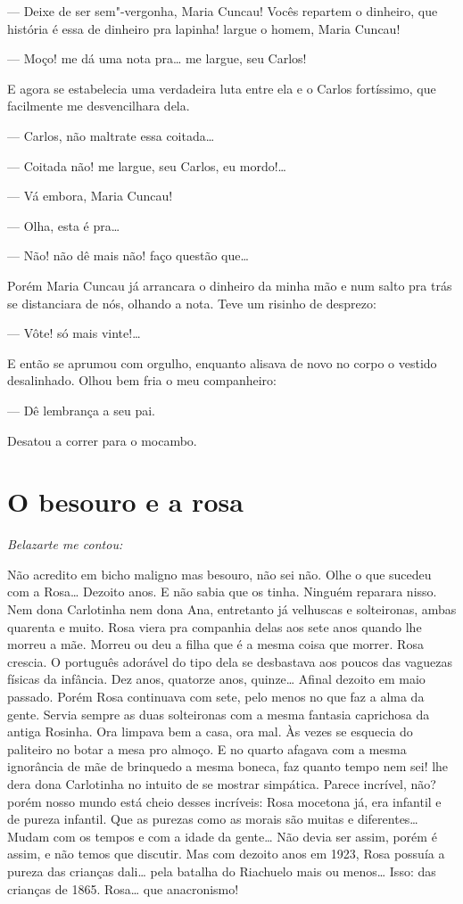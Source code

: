--- Deixe de ser sem"-vergonha, Maria Cuncau! Vocês repartem o dinheiro,
que história é essa de dinheiro pra lapinha! largue o homem, Maria
Cuncau!

--- Moço! me dá uma nota pra\ldots{} me largue, seu Carlos!

E agora se estabelecia uma verdadeira luta entre ela e o Carlos
fortíssimo, que facilmente me desvencilhara dela.

--- Carlos, não maltrate essa coitada\ldots{}

--- Coitada não! me largue, seu Carlos, eu mordo!\ldots{}

--- Vá embora, Maria Cuncau!

--- Olha, esta é pra\ldots{}

--- Não! não dê mais não! faço questão que\ldots{}

Porém Maria Cuncau já arrancara o dinheiro da minha mão e num salto pra
trás se distanciara de nós, olhando a nota. Teve um risinho de desprezo:

--- Vôte! só mais vinte!\ldots{}

E então se aprumou com orgulho, enquanto alisava de novo no corpo o
vestido desalinhado. Olhou bem fria o meu companheiro:

--- Dê lembrança a seu pai.

Desatou a correr para o mocambo.

\chapter{O besouro e a rosa}


\emph{Belazarte me contou:}

Não acredito em bicho maligno mas besouro, não sei não. Olhe o que
sucedeu com a Rosa\ldots{} Dezoito anos. E não sabia que os tinha. Ninguém
reparara nisso. Nem dona Carlotinha nem dona Ana, entretanto já
velhuscas e solteironas, ambas quarenta e muito. Rosa viera pra
companhia delas aos sete anos quando lhe morreu a mãe. Morreu ou deu a
filha que é a mesma coisa que morrer. Rosa crescia. O português adorável
do tipo dela se desbastava aos poucos das vaguezas físicas da infância.
Dez anos, quatorze anos, quinze\ldots{} Afinal dezoito em maio passado. Porém
Rosa continuava com sete, pelo menos no que faz a alma da gente. Servia
sempre as duas solteironas com a mesma fantasia caprichosa da antiga
Rosinha. Ora limpava bem a casa, ora mal. Às vezes se esquecia do
paliteiro no botar a mesa pro almoço. E no quarto afagava com a mesma
ignorância de mãe de brinquedo a mesma boneca, faz quanto tempo nem sei!
lhe dera dona Carlotinha no intuito de se mostrar simpática. Parece
incrível, não? porém nosso mundo está cheio desses incríveis: Rosa
mocetona já, era infantil e de pureza infantil. Que as purezas como as
morais são muitas e diferentes\ldots{} Mudam com os tempos e com a idade da
gente\ldots{} Não devia ser assim, porém é assim, e não temos que discutir.
Mas com dezoito anos em 1923, Rosa possuía a pureza das crianças dali\ldots{}
pela batalha do Riachuelo mais ou menos\ldots{} Isso: das crianças de 1865.
Rosa\ldots{} que anacronismo!

